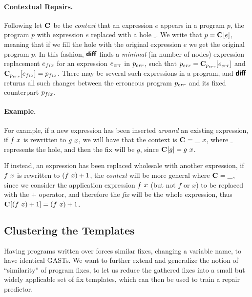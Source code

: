 \paragraph{Contextual Repairs.}
%
Following \cite{Felleisen92} let 
$\mathbf{C}_{}$ be the \emph{context} that 
an expression $e$ appears in a program $p$, 
\ie the program $p$ with expression $e$ 
replaced with a hole $\_$.
%
We write that $p = \mathbf{C}_{}[e]$, meaning 
that if we fill the hole with the original 
expression $e$ we get the original program 
$p$. 
%
In this fashion, $\bm{\mathsf{diff}}$ finds
a \emph{minimal} (in number of nodes) 
expression replacement $e_{fix}$ for an
expression $e_{err}$ in $p_{err}$, such 
that $p_{err} = \mathbf{C}_{p_{err}}[e_{err}]$ 
and $\mathbf{C}_{p_{err}}[e_{fix}] = p_{fix}$. 
%
There may be several such expressions 
in a program, and $\bm{\mathsf{diff}}$ returns 
all such changes between the erroneous 
program $p_{err}$ and its fixed counterpart 
$p_{fix}$.

\paragraph{Example.}
%
For example, if a new expression has been inserted \emph{around} an existing
expression, \eg if $f\ x$ is rewritten to $g\ x$, we will have
that the context is $\mathbf{C}_{} = \_\ x$, where $\_$ represents the
hole, and then the fix will be $g$, since $\mathbf{C}_{}[g] = g\ x$. 

If instead, an expression has been replaced wholesale with 
another expression, \eg if $f\ x$ is rewritten to 
$(f\ x) + 1$, the \emph{context} will be 
more general where $\mathbf{C}_{} = \_$, since we consider 
the application expression $f\ x$ (but not $f$ or $x$) 
to be replaced with the $+$ operator, and therefore 
the \emph{fix} will be the whole expression, thus
$\mathbf{C}_{}[(f\ x) + 1] = (f\ x) + 1$.

\subsection{Clustering the Templates}

Having programs written over \repairLang forces similar 
fixes, \ie changing a variable name, to have identical GASTs.
We want to further extend and generalize the notion of 
``similarity'' of program fixes, to let us reduce the 
gathered fixes into a small but widely applicable set 
of fix templates, which can then be used to train 
a repair predictor.


